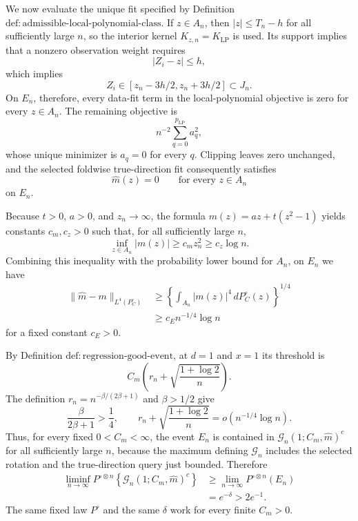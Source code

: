 We now evaluate the unique fit specified by Definition \(\mathrm{def:admissible\text{-}local\text{-}polynomial\text{-}class}\). If \(z\in A_n\), then \(|z|\le T_n-h\) for all sufficiently large \(n\), so the interior kernel \(K_{z,n}=K_{\mathrm{LP}}\) is used. Its support implies that a nonzero observation weight requires
\[
|Z_i-z|\le h,
\]
which implies
\[
Z_i\in[z_n-3h/2,z_n+3h/2]\subset J_n.
\]
On \(E_n\), therefore, every data-fit term in the local-polynomial objective is zero for every \(z\in A_n\). The remaining objective is
\[
n^{-2}\sum_{q=0}^{p_{\mathrm{LP}}}a_q^2,
\]
whose unique minimizer is \(a_q=0\) for every \(q\). Clipping leaves zero unchanged, and the selected foldwise true-direction fit consequently satisfies
\[
\widehat m(z)=0\qquad\text{for every }z\in A_n
\]
on \(E_n\).

Because \(t>0\), \(a>0\), and \(z_n\to\infty\), the formula \(m(z)=az+t(z^2-1)\) yields constants \(c_m,c_z>0\) such that, for all sufficiently large \(n\),
\[
\inf_{z\in A_n}|m(z)|\ge c_mz_n^2\ge c_z\log n.
\]
Combining this inequality with the probability lower bound for \(A_n\), on \(E_n\) we have
\[
\begin{aligned}
\|\widehat m-m\|_{L^4(P^\circ_C)}
&\ge\left\{\int_{A_n}|m(z)|^4\,dP^\circ_C(z)\right\}^{1/4}\\
&\ge c_E n^{-1/4}\log n
\end{aligned}
\]
for a fixed constant \(c_E>0\).

By Definition \(\mathrm{def:regression\text{-}good\text{-}event}\), at \(d=1\) and \(x=1\) its threshold is
\[
C_m\left(r_n+\sqrt{\frac{1+\log2}{n}}\right).
\]
The definition \(r_n=n^{-\beta/(2\beta+1)}\) and \(\beta>1/2\) give
\[
\frac{\beta}{2\beta+1}>\frac14,
\qquad
r_n+\sqrt{\frac{1+\log2}{n}}
=o\!\left(n^{-1/4}\log n\right).
\]
Thus, for every fixed \(0<C_m<\infty\), the event \(E_n\) is contained in \(\mathcal G_n(1;C_m,\widehat m)^c\) for all sufficiently large \(n\), because the maximum defining \(\mathcal G_n\) includes the selected rotation and the true-direction query just bounded. Therefore
\[
\begin{aligned}
\liminf_{n\to\infty}
P^{\circ\otimes n}\!\left\{\mathcal G_n(1;C_m,\widehat m)^c\right\}
&\ge\lim_{n\to\infty}P^{\circ\otimes n}(E_n)\\
&=e^{-\delta}>2e^{-1}.
\end{aligned}
\]
The same fixed law \(P^\circ\) and the same \(\delta\) work for every finite \(C_m>0\).

